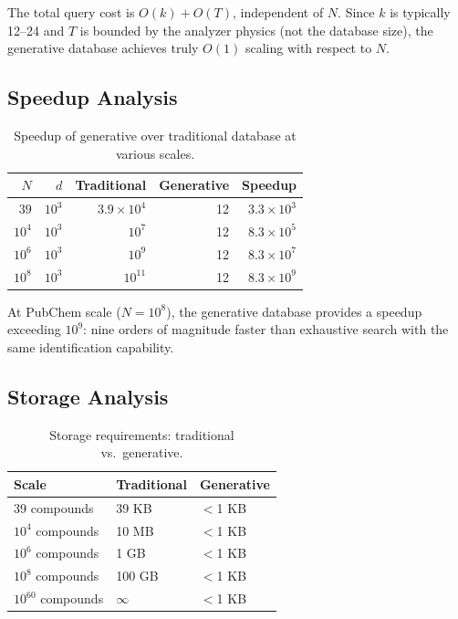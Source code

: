 \documentclass[11pt,twocolumn,a4paper]{article}
\theoremstyle{definition}
\theoremstyle{remark}
\begin{document}
The total query cost is $O(k) + O(T)$, independent of $N$. Since $k$ is typically 12--24 and $T$ is bounded by the analyzer physics (not the database size), the generative database achieves truly $O(1)$ scaling with respect to $N$.

\subsection{Speedup Analysis}
\label{sec:speedup}

\begin{table}[H]
\centering
\caption{Speedup of generative over traditional database at various scales.}
\label{tab:speedup}
\begin{tabular}{@{}rrrrr@{}}
\toprule
$N$ & $d$ & \textbf{Traditional} & \textbf{Generative} & \textbf{Speedup} \\
\midrule
$39$ & $10^3$ & $3.9 \times 10^4$ & 12 & $3.3 \times 10^3$ \\
$10^4$ & $10^3$ & $10^7$ & 12 & $8.3 \times 10^5$ \\
$10^6$ & $10^3$ & $10^9$ & 12 & $8.3 \times 10^7$ \\
$10^8$ & $10^3$ & $10^{11}$ & 12 & $8.3 \times 10^{9}$ \\
\bottomrule
\end{tabular}
\end{table}

At PubChem scale ($N = 10^8$), the generative database provides a speedup exceeding $10^9$: nine orders of magnitude faster than exhaustive search with the same identification capability.

\subsection{Storage Analysis}
\label{sec:storage-analysis}

\begin{table}[H]
\centering
\caption{Storage requirements: traditional vs.\ generative.}
\label{tab:storage}
\begin{tabular}{@{}lll@{}}
\toprule
\textbf{Scale} & \textbf{Traditional} & \textbf{Generative} \\
\midrule
39 compounds & 39 KB & $<$1 KB \\
$10^4$ compounds & 10 MB & $<$1 KB \\
$10^6$ compounds & 1 GB & $<$1 KB \\
$10^8$ compounds & 100 GB & $<$1 KB \\
$10^{60}$ compounds & $\infty$ & $<$1 KB \\
\bottomrule
\end{tabular}
\end{table}
\end{document}
